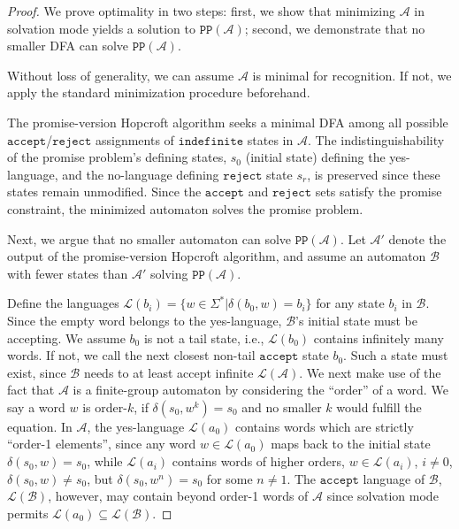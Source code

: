 \documentclass[../main.tex]{subfiles}
\begin{document}
\begin{proof}
    We prove optimality in two steps: first, we show that minimizing $\mathcal{A}$ in solvation mode yields a solution to $\mathtt{PP}(\mathcal{A})$; second, we demonstrate that no smaller DFA can solve $\mathtt{PP}(\mathcal{A})$.

    Without loss of generality,  we can assume $\mathcal{A}$ is minimal for recognition. If not, we apply the standard minimization procedure beforehand.

    The promise-version Hopcroft algorithm seeks a minimal DFA among all possible $\mathtt{accept}$/$\mathtt{reject}$  assignments of $\mathtt{indefinite}$ states in $\mathcal{A}$. The indistinguishability of the promise problem's defining states, $s_0$ (initial state) defining the yes-language, and the no-language defining $\mathtt{reject}$  state $s_r$, is preserved since these states remain unmodified. Since the $\mathtt{accept}$ and $\mathtt{reject}$  sets satisfy the promise constraint, the minimized automaton solves the promise problem.
    
    Next, we argue that no smaller automaton can solve $\mathtt{PP}(\mathcal{A})$. Let $\mathcal{A}'$ denote the output of the promise-version Hopcroft algorithm, and assume an automaton $\mathcal{B}$ with fewer states than $\mathcal{A}'$ solving $\mathtt{PP}(\mathcal{A})$.

    Define the languages $\mathcal{L}(b_i) = \{w \in \Sigma^* | \delta(b_0, w) = b_i \}$ for any state $b_i$ in $\mathcal{B}$. Since the empty word belongs to the yes-language, $\mathcal{B}$'s initial state must be accepting. We assume $b_0$ is not a tail state, i.e., $\mathcal{L}(b_0)$ contains infinitely many words. If not, we call the next closest non-tail $\mathtt{accept}$ state $b_0$. Such a state must exist, since $\mathcal{B}$ needs to at least accept infinite $\mathcal{L}(\mathcal{A})$.
    We next make use of the fact that $\mathcal{A}$ is a finite-group automaton by considering the ``order'' of a word. We say a word $w$ is order-$k$, if $\delta(s_0,w^k)=s_0$ and no smaller $k$ would fulfill the equation. 
    In $\mathcal{A}$, the yes-language $\mathcal{L}(a_0)$ contains words which are strictly ``order-1 elements'', since any word $w \in \mathcal{L}(a_0)$ maps back to the initial state $\delta(s_0, w) = s_0$, while $\mathcal{L}(a_i)$ contains words of higher orders, $w \in \mathcal{L}(a_i)$, $i \neq 0$, $\delta(s_0, w) \neq s_0$, but $\delta(s_0, w^n) = s_0$ for some $n \neq 1$. The $\mathtt{accept}$ language of $\mathcal{B}$, $\mathcal{L}(\mathcal{B})$, however, may contain beyond order-1 words of $\mathcal{A}$ since solvation mode permits $\mathcal{L}(a_0) \subseteq \mathcal{L}(\mathcal{B})$.
    

\end{proof}
\end{document}
